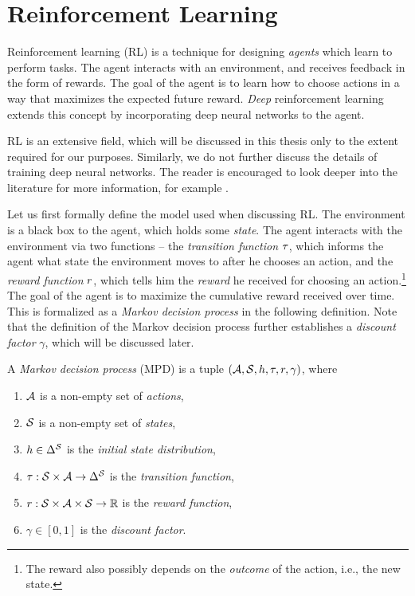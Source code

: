 \section{Reinforcement Learning}
\label{sec:rl}

Reinforcement learning (RL) is a technique for designing \emph{agents} which learn to perform tasks.
The agent interacts with an environment, and receives feedback in the form of rewards.
The goal of the agent is to learn how to choose actions in a way that maximizes the expected future reward.
\emph{Deep} reinforcement learning extends this concept by incorporating deep neural networks to the agent.

RL is an extensive field, which will be discussed in this thesis only to the extent required for our purposes.
Similarly, we do not further discuss the details of training deep neural networks.
The reader is encouraged to look deeper into the literature for more information, for example \cite{sutton2018reinforcement,bengio2017deep}.

Let us first formally define the model used when discussing RL.
The environment is a black box to the agent, which holds some \emph{state}.
The agent interacts with the environment via two functions -- the \emph{transition function} $ \tau $, which informs the agent what state the environment moves to after he chooses an action,
and the \emph{reward function} $ r $, which tells him the \emph{reward} he received for choosing an action.\footnote{The reward also possibly depends on the \emph{outcome} of the action, i.e., the new state.}
The goal of the agent is to maximize the cumulative reward received over time.
This is formalized as a \emph{Markov decision process} in the following definition.
Note that the definition of the Markov decision process further establishes a \emph{discount factor} $ \gamma $, which will be discussed later.

\begin{defi}\label{def:mdp}
	A \emph{Markov decision process} (MPD) is a tuple $ \left( \mathcal{A}, \mathcal{S}, h, \tau, r, \gamma \right) $, where \begin{enumerate}[ ]
		\item $ \mathcal{A} $ is a non-empty set of \emph{actions},
		\item $ \mathcal{S} $ is a non-empty set of \emph{states},
		\item $ h \in \Delta^{\mathcal{S}} $ is the \emph{initial state distribution},
		\item $ \tau: \mathcal{S} \times \mathcal{A} \to \Delta^{\mathcal{S}} $ is the \emph{transition function},
		\item $ r: \mathcal{S} \times \mathcal{A} \times \mathcal{S} \to \mathbb{R} $ is the \emph{reward function},
		\item $ \gamma \in \left[ 0,1 \right] $ is the \emph{discount factor}.
	\end{enumerate}
\end{defi}

